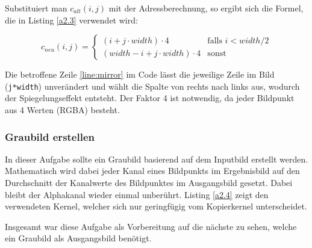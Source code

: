 \documentclass[12pt,a4paper]{scrartcl}
\begin{document}
Substituiert man $c_{alt}(i,j)$ mit der Adressberechnung, so ergibt sich die Formel, die in Listing \ref{a2.3} verwendet wird:

\begin{equation} \label{eq:mirror}
    c_{neu}(i,j) =
        \begin{cases}
            (i + j \cdot width) \cdot 4 & \text{falls } i < width/2\\
            (width-i + j \cdot width) \cdot 4 & \text{sonst }
        \end{cases}
\end{equation}

Die betroffene Zeile \ref{line:mirror} im Code l\"asst die jeweilige Zeile im Bild (\texttt{j*width}) unver\"andert und w\"ahlt die Spalte von rechts nach links aus, wodurch der Spiegelungseffekt entsteht.
Der Faktor 4 ist notwendig, da jeder Bildpunkt aus 4 Werten (RGBA) besteht.

\subsubsection{Graubild erstellen}
In dieser Aufgabe sollte ein Graubild basierend auf dem Inputbild erstellt werden.
Mathematisch wird dabei jeder Kanal eines Bildpunkts im Ergebnisbild auf den Durchschnitt der Kanalwerte des Bildpunktes im Ausgangsbild gesetzt.
Dabei bleibt der Alphakanal wieder einmal unber\"uhrt.
Listing \ref{a2.4} zeigt den verwendeten Kernel, welcher sich nur geringf\"ugig vom Kopierkernel unterscheidet. 

Insgesamt war diese Aufgabe als Vorbereitung auf die n\"achste zu sehen, welche ein Graubild als Ausgangsbild ben\"otigt.
\end{document}
